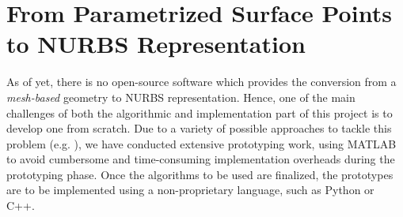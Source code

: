 \section{From Parametrized Surface Points to NURBS Representation}
As of yet, there is no open-source software which provides the conversion from a \textit{mesh-based} geometry to NURBS representation. Hence, one of the main challenges of both the algorithmic and implementation part of this project is to develop one from scratch. Due to a variety of possible approaches to tackle this problem (e.g. \cite{ eck1996automatic, becker2011advanced}), we have conducted extensive prototyping work, using MATLAB \cite{MATLAB} to avoid cumbersome and time-consuming implementation overheads during the prototyping phase. Once the algorithms to be used are finalized, the prototypes are to be implemented using a non-proprietary language, such as Python or C++.

%

